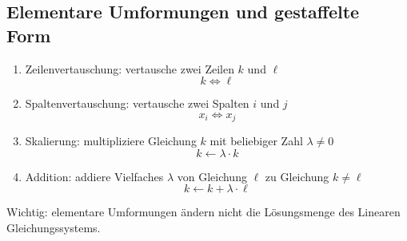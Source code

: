 \documentclass[a4paper,12pt]{article}
\theoremstyle{definition}
\begin{document}
	\subsection{Elementare Umformungen und gestaffelte Form}
	\begin{enumerate}[label=(\alph*)]
		\item Zeilenvertauschung: vertausche zwei Zeilen $k$ und $\ell$
		\[
			k \Leftrightarrow \ell
		\]
		\item Spaltenvertauschung: vertausche zwei Spalten $i$ und $j$
		\[
			x_i \Leftrightarrow x_j
		\]
		\item Skalierung: multipliziere Gleichung $k$ mit beliebiger Zahl $\lambda \neq 0$
		\[
			k \gets \lambda \cdot k
		\]
		\item Addition: addiere Vielfaches $\lambda$ von Gleichung $\ell$ zu Gleichung $k \neq \ell$
		\[
			k \gets k + \lambda \cdot \ell
		\]
	\end{enumerate}
	Wichtig: elementare Umformungen ändern nicht die Lösungsmenge des Linearen Gleichungssystems.
\end{document}
